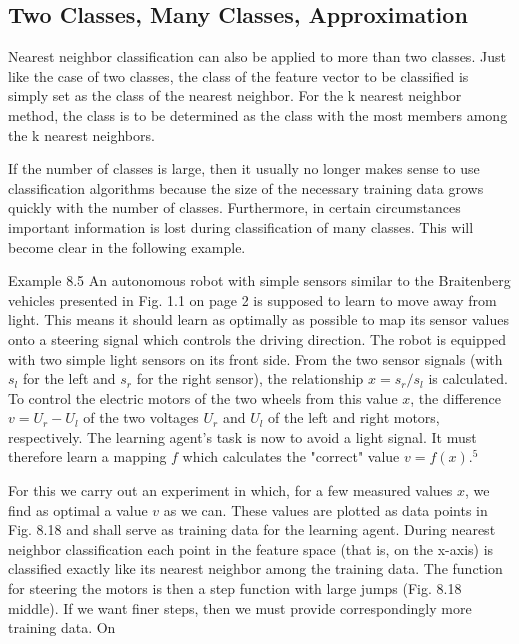 \documentclass[10pt]{book}
\begin{document}
\subsection{Two Classes, Many Classes, Approximation}
Nearest neighbor classification can also be applied to more than two classes. Just like the case of two classes, the class of the feature vector to be classified is simply set as the class of the nearest neighbor. For the k nearest neighbor method, the class is to be determined as the class with the most members among the k nearest neighbors.

If the number of classes is large, then it usually no longer makes sense to use classification algorithms because the size of the necessary training data grows quickly with the number of classes. Furthermore, in certain circumstances important information is lost during classification of many classes. This will become clear in the following example.

Example 8.5 An autonomous robot with simple sensors similar to the Braitenberg vehicles presented in Fig. 1.1 on page 2 is supposed to learn to move away from light. This means it should learn as optimally as possible to map its sensor values onto a steering signal which controls the driving direction. The robot is equipped with two simple light sensors on its front side. From the two sensor signals (with $s_{l}$ for the left and $s_{r}$ for the right sensor), the relationship $x=s_{r} / s_{l}$ is calculated. To control the electric motors of the two wheels from this value $x$, the difference $v=U_{r}-U_{l}$ of the two voltages $U_{r}$ and $U_{l}$ of the left and right motors, respectively. The learning agent's task is now to avoid a light signal. It must therefore learn a mapping $f$ which calculates the "correct" value $v=f(x) .^{5}$

For this we carry out an experiment in which, for a few measured values $x$, we find as optimal a value $v$ as we can. These values are plotted as data points in Fig. 8.18 and shall serve as training data for the learning agent. During nearest neighbor classification each point in the feature space (that is, on the x-axis) is classified exactly like its nearest neighbor among the training data. The function for steering the motors is then a step function with large jumps (Fig. 8.18 middle). If we want finer steps, then we must provide correspondingly more training data. On
\end{document}
